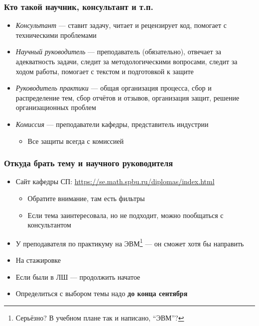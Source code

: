 \documentclass{../../slides-style}
\begin{document}
    \begin{frame}
        \frametitle{Кто такой научник, консультант и т.п.}
        \begin{itemize}
            \item \textit{Консультант} --- ставит задачу, читает и рецензирует код, помогает с техническими проблемами
            \item \textit{Научный руководитель} --- преподаватель (обязательно), отвечает за адекватность задачи, следит за методологическими вопросами, следит за ходом работы, помогает с текстом и подготовкой к защите
            \item \textit{Руководитель практики} --- общая организация процесса, сбор и распределение тем, сбор отчётов и отзывов, организация защит, решение организационных проблем
            \item \textit{Комиссия} --- преподаватели кафедры, представитель индустрии
            \begin{itemize}
                \item Все защиты всегда с комиссией
            \end{itemize}
        \end{itemize}
    \end{frame}

    \begin{frame}
        \frametitle{Откуда брать тему и научного руководителя}
        \begin{itemize}
            \item Сайт кафедры СП: \url{https://se.math.spbu.ru/diplomas/index.html}
            \begin{itemize}
                \item Обратите внимание, там есть фильтры
                \item Если тема заинтересовала, но не подходит, можно пообщаться с консультантом
            \end{itemize}
            \item У преподавателя по практикуму на ЭВМ\footnote{Серьёзно? В учебном плане так и написано, ``ЭВМ''?} --- он сможет хотя бы направить
            \item На стажировке
            \item Если были в ЛШ --- продолжить начатое
            \item Определиться с выбором темы надо \textbf{до конца сентября}
        \end{itemize}
    \end{frame}
\end{document}
